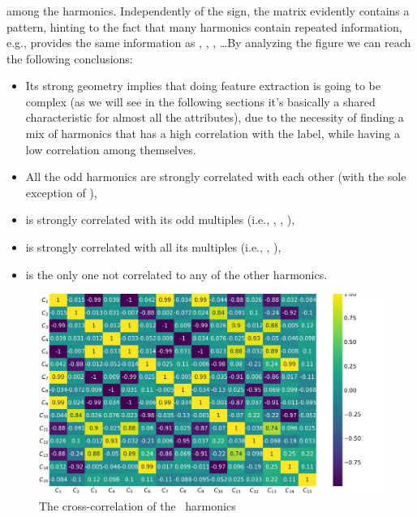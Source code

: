 \subsubsection{\an}
 among the harmonics. Independently of the sign, the matrix evidently contains a
pattern, hinting to the fact that many harmonics contain repeated information, e.g., \an[1] provides
the same information as \an[3], \an[5], \an[7], \ldots By analyzing the figure we can reach the
following conclusions:
\begin{itemize}
	\item Its strong geometry implies that doing feature extraction is going to be complex (as
	      we will see in the following sections it's basically a shared characteristic for
	      almost all the attributes), due to the necessity of finding a mix of harmonics that has a high correlation with the label, while having a low correlation among themselves.
	\item All the odd harmonics are strongly correlated with each other (with the sole exception
	      of \an[15]),
	\item \an[2] is strongly correlated with its odd multiples (i.e., \an[6], \an[10], \an[14]),
	\item \an[4] is strongly correlated with all its multiples (i.e., \an[8], \an[12]),
	\item \an[15] is the only one not correlated to any of the other harmonics.
\end{itemize}
\begin{figure}
	\centering
	\includegraphics[width=\linewidth]{img/An_corr_matrix.png}
	\caption{The cross-correlation of the \an\ harmonics} \label{fig:an-corr}
\end{figure}

